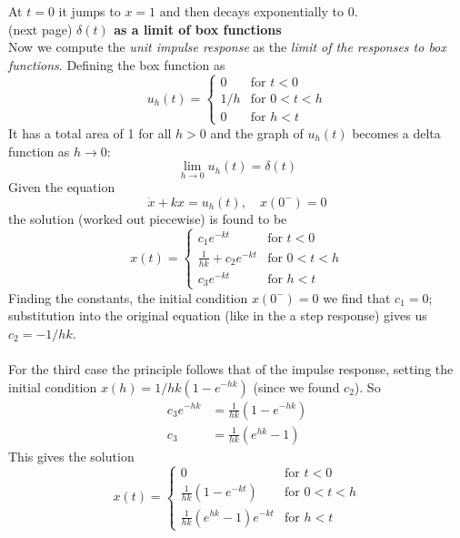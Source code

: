 \documentclass{report}
\begin{document}
At $t=0$ it jumps to $x=1$ and then decays exponentially to 0.\\
(next page)
\newpage
\noindent\textbf{$\delta(t)$ as a limit of box functions}\\
Now we compute the \textit{unit impulse response} as the \textit{limit of the responses to box functions}. Defining
the box function as 
\begin{equation*}
u_h(t)=\begin{cases}
0&\text{for }t<0\\
1/h&\text{for }0<t<h\\
0&\text{for }h<t
\end{cases}
\end{equation*}
It has a total area of 1 for all $h>0$ and the graph of $u_h(t)$ becomes a delta function as $h\to0$:
\begin{equation*}
\lim_{h\to0}u_h(t)=\delta(t)
\end{equation*}
Given the equation
\begin{equation*}
\dot{x}+kx=u_h(t),\quad x(0^-)=0
\end{equation*}
the solution (worked out piecewise) is found to be
\begin{equation*}
x(t)=\begin{cases}
c_1e^{-kt}&\text{for }t<0\\
\frac{1}{hk}+c_2e^{-kt}&\text{for }0<t<h\\
c_3e^{-kt}&\text{for }h<t
\end{cases}
\end{equation*}
Finding the constants, the initial condition $x(0^-)=0$ we find that $c_1=0$; substitution into the original
equation (like in the a step response) gives us $c_2=-1/hk$.\\
\vspace{1mm}\\
For the third case the principle follows that of the impulse response, setting the initial condition 
$x(h)=1/hk(1-e^{-hk})$ (since we found $c_2$). So
\begin{align*}
c_3e^{-hk}&=\frac{1}{hk}(1-e^{-hk})\\
c_3&=\frac{1}{hk}(e^{hk}-1)
\end{align*}
This gives the solution
\begin{equation*}
x(t)=\begin{cases}
0&\text{for }t<0\\
\frac{1}{hk}(1-e^{-kt})&\text{for }0<t<h\\
\frac{1}{hk}(e^{hk}-1)e^{-kt}&\text{for }h<t\end{cases}
\end{equation*}
\end{document}
